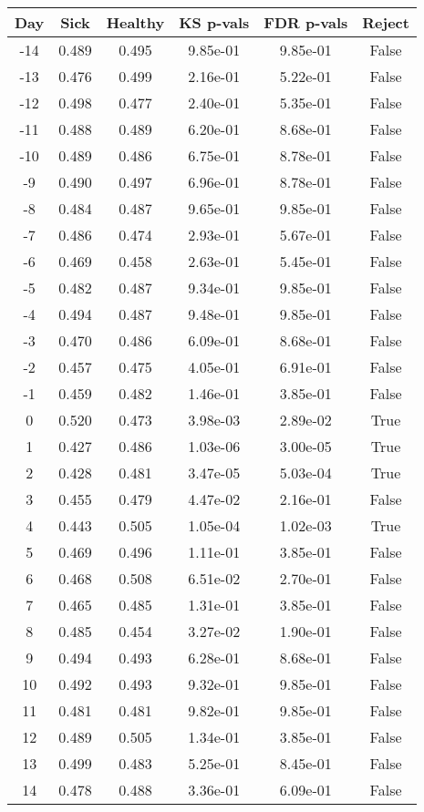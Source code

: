 \begin{tabular}{c|c|c|c|c|c}
Day &  Sick & Healthy &  KS p-vals & FDR p-vals & Reject\\
\hline
-14 & 0.489 &   0.495 &   9.85e-01 &   9.85e-01 &  False\\
-13 & 0.476 &   0.499 &   2.16e-01 &   5.22e-01 &  False\\
-12 & 0.498 &   0.477 &   2.40e-01 &   5.35e-01 &  False\\
-11 & 0.488 &   0.489 &   6.20e-01 &   8.68e-01 &  False\\
-10 & 0.489 &   0.486 &   6.75e-01 &   8.78e-01 &  False\\
 -9 & 0.490 &   0.497 &   6.96e-01 &   8.78e-01 &  False\\
 -8 & 0.484 &   0.487 &   9.65e-01 &   9.85e-01 &  False\\
 -7 & 0.486 &   0.474 &   2.93e-01 &   5.67e-01 &  False\\
 -6 & 0.469 &   0.458 &   2.63e-01 &   5.45e-01 &  False\\
 -5 & 0.482 &   0.487 &   9.34e-01 &   9.85e-01 &  False\\
 -4 & 0.494 &   0.487 &   9.48e-01 &   9.85e-01 &  False\\
 -3 & 0.470 &   0.486 &   6.09e-01 &   8.68e-01 &  False\\
 -2 & 0.457 &   0.475 &   4.05e-01 &   6.91e-01 &  False\\
 -1 & 0.459 &   0.482 &   1.46e-01 &   3.85e-01 &  False\\
  0 & 0.520 &   0.473 &   3.98e-03 &   2.89e-02 &   True\\
  1 & 0.427 &   0.486 &   1.03e-06 &   3.00e-05 &   True\\
  2 & 0.428 &   0.481 &   3.47e-05 &   5.03e-04 &   True\\
  3 & 0.455 &   0.479 &   4.47e-02 &   2.16e-01 &  False\\
  4 & 0.443 &   0.505 &   1.05e-04 &   1.02e-03 &   True\\
  5 & 0.469 &   0.496 &   1.11e-01 &   3.85e-01 &  False\\
  6 & 0.468 &   0.508 &   6.51e-02 &   2.70e-01 &  False\\
  7 & 0.465 &   0.485 &   1.31e-01 &   3.85e-01 &  False\\
  8 & 0.485 &   0.454 &   3.27e-02 &   1.90e-01 &  False\\
  9 & 0.494 &   0.493 &   6.28e-01 &   8.68e-01 &  False\\
 10 & 0.492 &   0.493 &   9.32e-01 &   9.85e-01 &  False\\
 11 & 0.481 &   0.481 &   9.82e-01 &   9.85e-01 &  False\\
 12 & 0.489 &   0.505 &   1.34e-01 &   3.85e-01 &  False\\
 13 & 0.499 &   0.483 &   5.25e-01 &   8.45e-01 &  False\\
 14 & 0.478 &   0.488 &   3.36e-01 &   6.09e-01 &  False\\
\end{tabular}